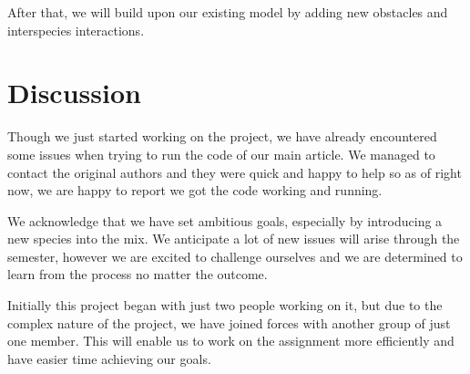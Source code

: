 \documentclass[9pt]{pnas-new}
\begin{document}
After that, we will build upon our existing model by adding new obstacles and interspecies interactions. 

\section*{Discussion}
Though we just started working on the project, we have already encountered some issues when trying to run the code of our main article. We managed to contact the original authors and they were quick and happy to help so as of right now, we are happy to report we got the code working and running. 

We acknowledge that we have set ambitious goals, especially by introducing a new species into the mix. We anticipate a lot of new issues will arise through the semester, however we are excited to challenge ourselves and we are determined to learn from the process no matter the outcome.

Initially this project began with just two people working on it, but due to the complex nature of the project, we have joined forces with another group of just one member. This will enable us to work on the assignment more efficiently and have easier time achieving our goals.


\showacknow %


\begin{multicols}{2}
\end{multicols}
\end{document}
